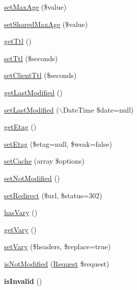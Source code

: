 \begin{DoxyCompactItemize}
\item 
\hyperlink{class_symfony_1_1_component_1_1_http_foundation_1_1_response_a497ad472b048066e005241ff765bcb14}{set\-Max\-Age} (\$value)
\item 
\hyperlink{class_symfony_1_1_component_1_1_http_foundation_1_1_response_a8678823de3e9f0818377b958db8dd4a5}{set\-Shared\-Max\-Age} (\$value)
\item 
\hyperlink{class_symfony_1_1_component_1_1_http_foundation_1_1_response_ac7d331a457832abf72b84ee724893b46}{get\-Ttl} ()
\item 
\hyperlink{class_symfony_1_1_component_1_1_http_foundation_1_1_response_a8c0e51d31a6fcea2e7a66e3a162a75ec}{set\-Ttl} (\$seconds)
\item 
\hyperlink{class_symfony_1_1_component_1_1_http_foundation_1_1_response_a05275d4df5697c1fb74e8cc0abaf8f9f}{set\-Client\-Ttl} (\$seconds)
\item 
\hyperlink{class_symfony_1_1_component_1_1_http_foundation_1_1_response_aa388e2fda4fe702e8953c1a731868f18}{get\-Last\-Modified} ()
\item 
\hyperlink{class_symfony_1_1_component_1_1_http_foundation_1_1_response_af87ce0a9e0c60c997a17ec76d57fb102}{set\-Last\-Modified} ($\backslash$\-Date\-Time \$date=null)
\item 
\hyperlink{class_symfony_1_1_component_1_1_http_foundation_1_1_response_a2bc78962fcd803b1b158a67cba4126c3}{get\-Etag} ()
\item 
\hyperlink{class_symfony_1_1_component_1_1_http_foundation_1_1_response_a4500d98cd73eee07089236f4d6a35574}{set\-Etag} (\$etag=null, \$weak=false)
\item 
\hyperlink{class_symfony_1_1_component_1_1_http_foundation_1_1_response_af4b808195c95677c40a99b787c0ce25c}{set\-Cache} (array \$options)
\item 
\hyperlink{class_symfony_1_1_component_1_1_http_foundation_1_1_response_a01705a28c37181815d9c91c3adfc1021}{set\-Not\-Modified} ()
\item 
\hyperlink{class_symfony_1_1_component_1_1_http_foundation_1_1_response_ac0b573b33dbf69ceba9981e09ae90c78}{set\-Redirect} (\$url, \$status=302)
\item 
\hyperlink{class_symfony_1_1_component_1_1_http_foundation_1_1_response_a3c4758fa7aa5fb19922331c79c3ce7d1}{has\-Vary} ()
\item 
\hyperlink{class_symfony_1_1_component_1_1_http_foundation_1_1_response_a5e6e66f2f3d419f93712bd6c9a0d151a}{get\-Vary} ()
\item 
\hyperlink{class_symfony_1_1_component_1_1_http_foundation_1_1_response_a9c042b5c04fc2f642730c0a5c473d91f}{set\-Vary} (\$headers, \$replace=true)
\item 
\hyperlink{class_symfony_1_1_component_1_1_http_foundation_1_1_response_abba0b252963040b62604b8c2902c8ebb}{is\-Not\-Modified} (\hyperlink{class_symfony_1_1_component_1_1_http_foundation_1_1_request}{\-Request} \$request)
\item 
\hypertarget{class_symfony_1_1_component_1_1_http_foundation_1_1_response_a7806d6af3b4912a00d1018cb503c2fc1}{
{\bfseries is\-Invalid} ()}
\label{class_symfony_1_1_component_1_1_http_foundation_1_1_response_a7806d6af3b4912a00d1018cb503c2fc1}


\end{DoxyCompactItemize}
